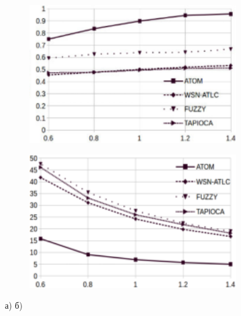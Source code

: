 \begin{figure}[H]
	\centering
	\includegraphics[width=0.8\textwidth]{assets/161}
	\caption*{}
\end{figure}\begin{figure}[H]
	\centering
	\includegraphics[width=0.8\textwidth]{assets/162}
	\caption*{}
\end{figure}

а) б)

